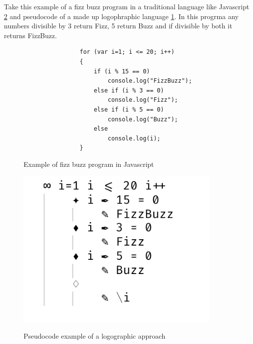 \documentclass[12pt]{article}
\begin{document}
Take this example of a fizz buzz program in a traditional language like Javascript \ref{fig:javascript} and pseudocode of a made up logophraphic language \ref{fig:logograph}.
In this progrma any numbers divisible by 3 return Fizz, 5 return Buzz and if divisible by both it returns FizzBuzz.

\begin{figure}[h]
    \caption{Example of fizz buzz program in Javascript}
    \centering
    \begin{verbatim}
                for (var i=1; i <= 20; i++)
                {
                    if (i % 15 == 0)
                        console.log("FizzBuzz");
                    else if (i % 3 == 0)
                        console.log("Fizz");
                    else if (i % 5 == 0)
                        console.log("Buzz");
                    else
                        console.log(i);
                }
    \end{verbatim}
    \label{fig:logograph}
\end{figure}    


\begin{figure}[h]
    \caption{Pseudocode example of a logographic approach}
    \centering
    \includegraphics[width=10cm]{logograph}
    \label{fig:javascript}
\end{figure}   


\clearpage

\printbibliography
\end{document}

